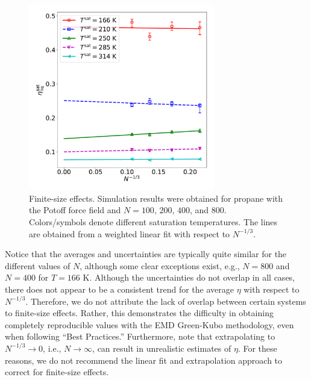 \documentclass[preprint,review,12pt]{elsarticle}
\begin{document}
	
	
	
	\begin{figure}[htb!]
		\centering
		\includegraphics[width=3.2in]{C3H8_Potoff_finite_size_effects.pdf}
		\caption{Finite-size effects. Simulation results were obtained for propane with the Potoff force field and $N= 100$, $200$, $400$, and $800$. Colors/symbols denote different saturation temperatures. The lines are obtained from a weighted linear fit with respect to $N^{-1/3}$.}
		\label{fig:finite_size_effects}
	\end{figure} 
	
	Notice that the averages and uncertainties are typically quite similar for the different values of $N$, although some clear exceptions exist, e.g., $N = 800$ and $N=400$ for $T = 166$ K. Although the uncertainties do not overlap in all cases, there does not appear to be a consistent trend for the average $\eta$ with respect to $N^{-1/3}$. Therefore, we do not attribute the lack of overlap between certain systems to finite-size effects. Rather, this demonstrates the difficulty in obtaining completely reproducible values with the EMD Green-Kubo methodology, even when following ``Best Practices.'' Furthermore, note that extrapolating to $N^{-1/3} \rightarrow 0$, i.e., $N \rightarrow \infty$, can result in unrealistic estimates of $\eta$. For these reasons, we do not recommend the linear fit and extrapolation approach to correct for finite-size effects.
	
\end{document}
